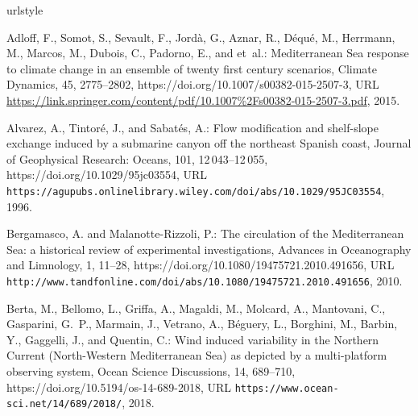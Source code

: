 \documentclass[essd]{copernicus}
\begin{document}
%
%
\begin{thebibliography}{46}
\providecommand{\natexlab}[1]{#1}
\providecommand{\url}[1]{{\tt #1}}
\providecommand{\urlprefix}{URL }
\expandafter\ifx\csname urlstyle\endcsname\relax
  \providecommand{\doi}[1]{https://doi.org/\discretionary{}{}{}#1}\else
  \providecommand{\doi}{https://doi.org/\discretionary{}{}{}\begingroup
  \urlstyle{rm}\Url}\fi

Adloff, F., Somot, S., Sevault, F., Jord\`{a}, G., Aznar, R., D\'{e}qu\'{e},
  M., Herrmann, M., Marcos, M., Dubois, C., Padorno, E., and et~al.:
  Mediterranean Sea response to climate change in an ensemble of twenty first
  century scenarios, Climate Dynamics, 45, 2775–2802,
  \doi{10.1007/s00382-015-2507-3},
  \urlprefix\url{https://link.springer.com/content/pdf/10.1007%2Fs00382-015-2507-3.pdf},
  2015.

Alvarez, A., Tintor\'{e}, J., and Sabat\'{e}s, A.: {Flow modification and
  shelf-slope exchange induced by a submarine canyon off the northeast Spanish
  coast}, Journal of Geophysical Research: Oceans, 101, 12\,043–12\,055,
  \doi{10.1029/95jc03554},
  \urlprefix\url{https://agupubs.onlinelibrary.wiley.com/doi/abs/10.1029/95JC03554},
  1996.

Bergamasco, A. and Malanotte-Rizzoli, P.: The circulation of the Mediterranean
  Sea: a historical review of experimental investigations, Advances in
  Oceanography and Limnology, 1, 11–28, \doi{10.1080/19475721.2010.491656},
  \urlprefix\url{http://www.tandfonline.com/doi/abs/10.1080/19475721.2010.491656},
  2010.

Berta, M., Bellomo, L., Griffa, A., Magaldi, M., Molcard, A., Mantovani, C.,
  Gasparini, G.~P., Marmain, J., Vetrano, A., B\'{e}guery, L., Borghini, M.,
  Barbin, Y., Gaggelli, J., and Quentin, C.: {Wind induced variability in the
  Northern Current (North-Western Mediterranean Sea) as depicted by a
  multi-platform observing system}, Ocean Science Discussions, 14, 689--710,
  \doi{10.5194/os-14-689-2018},
  \urlprefix\url{https://www.ocean-sci.net/14/689/2018/}, 2018.


\end{thebibliography}
\end{document}
